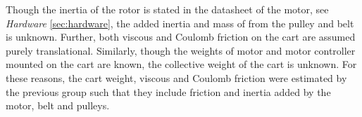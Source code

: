 Though the inertia of the rotor is stated in the datasheet of the motor, see \textit{Hardware} \autoref{sec:hardware}, the added inertia and mass of from the pulley and belt is unknown. Further, both viscous and Coulomb friction on the cart are assumed purely translational. Similarly, though the weights of motor and motor controller mounted on the cart are known, the collective weight of the cart is unknown. For these reasons, the cart weight, viscous and Coulomb friction were estimated by the previous group such that they include friction and inertia added by the motor, belt and pulleys.